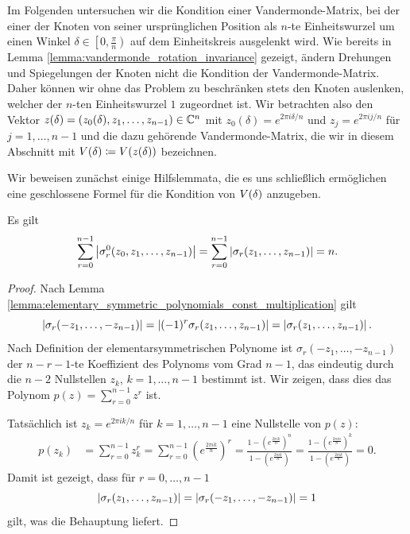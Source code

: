 Im Folgenden untersuchen wir die Kondition einer Vandermonde-Matrix, bei der
einer der Knoten von seiner ursprünglichen Position als $n$-te Einheitswurzel
um einen Winkel $\delta \in \left[0,\frac{\pi}{n}\right)$ auf dem Einheitskreis
ausgelenkt wird.
Wie bereits in Lemma \ref{lemma:vandermonde_rotation_invariance} gezeigt,
ändern Drehungen und Spiegelungen der Knoten nicht die Kondition der
Vandermonde-Matrix.
Daher können wir ohne das Problem zu beschränken stets den Knoten auslenken,
welcher der $n$-ten Einheitswurzel $1$ zugeordnet ist.
Wir betrachten also den Vektor $z(\delta) = (z_0(\delta), z_1, \dots, z_{n-1}) \in \mathbb{C}^n$ mit
$z_0(\delta) = e^{2 \pi i \delta / n}$
und
$z_j = e^{2 \pi i j / n}$ für $j = 1, \dots, n-1$
und die dazu gehörende Vandermonde-Matrix, die wir in diesem Abschnitt
mit $V \! \left( \delta \right) \coloneqq V \! \left( z(\delta) \right)$ bezeichnen.



Wir beweisen zunächst einige Hilfslemmata, die es uns schließlich ermöglichen
eine geschlossene Formel für die Kondition von $V \! \left( \delta \right)$ anzugeben.

\begin{lemma}
    Es gilt
    \[
        \sum_{r=0}^{n-1} \left\lvert \sigma_r^0(z_0, z_1, \dots, z_{n-1}) \right\rvert
        = \sum_{r=0}^{n-1} \left\lvert \sigma_r(z_1, \dots, z_{n-1}) \right\rvert
        = n.
    \]
\end{lemma}

\begin{proof}
    Nach Lemma \ref{lemma:elementary_symmetric_polynomials_const_multiplication}
    gilt
    \[
        \left\lvert \sigma_r(-z_1, \dots, -z_{n-1}) \right\rvert
        = \left\lvert (-1)^r \sigma_r(z_1, \dots, z_{n-1}) \right\rvert
        = \left\lvert \sigma_r(z_1, \dots, z_{n-1}) \right\rvert.
    \]
    Nach Definition der elementarsymmetrischen Polynome ist
    $\sigma_r({-z_1, \dots, -z_{n-1}})$
    der ${n\!-\!r\!-\!1}$-te Koeffizient des Polynoms vom
    Grad $n-1$, das eindeutig durch die $n-2$ Nullstellen
    $z_k$, $k=1, \dots, n-1$ bestimmt ist.
    Wir zeigen, dass dies das Polynom $p(z) = \sum_{r=0}^{n-1} z^r$ ist.

    \noindent Tatsächlich ist $z_k = e^{2 \pi i k / n}$ für $k = 1, \dots, n-1$
    eine Nullstelle von $p(z)$:
    \[
        \begin{split}
            p(z_k)
            &= \sum_{r=0}^{n-1} z_k^r
            = \sum_{r=0}^{n-1} \left( e^{\frac{2 \pi i k}{n}} \right)^r
            = \frac{1 - \left( e^{\frac{2 \pi i k}{n}} \right)^n}{1 - \left( e^{\frac{2 \pi i k}{n}} \right)}
            = \frac{1 - \left( e^{\frac{2 \pi i n}{n}} \right)^k}{1 - \left( e^{\frac{2 \pi i k}{n}} \right)}
            = 0.
        \end{split}
    \]
    Damit ist gezeigt, dass für $r=0, \dots, n-1$
    \[
        \left\lvert \sigma_r(z_1, \dots, z_{n-1}) \right\rvert
        = \left\lvert \sigma_r(-z_1, \dots, -z_{n-1}) \right\rvert
        = 1
    \]
    gilt, was die Behauptung liefert.
\end{proof}

